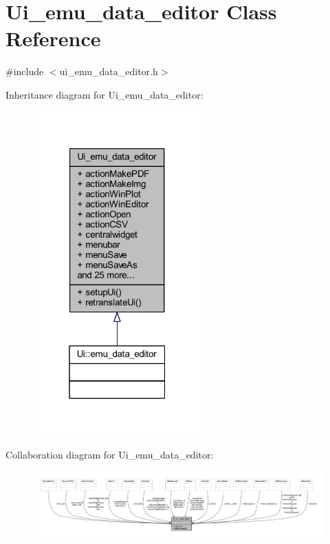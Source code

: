 \hypertarget{a00026}{\section{Ui\+\_\+emu\+\_\+data\+\_\+editor Class Reference}
\label{a00026}
}


{\ttfamily \#include $<$ui\+\_\+emu\+\_\+data\+\_\+editor.\+h$>$}



Inheritance diagram for Ui\+\_\+emu\+\_\+data\+\_\+editor\+:
\nopagebreak
\begin{figure}[H]
\begin{center}
\leavevmode
\includegraphics[width=184pt]{d1/d5d/a00311}
\end{center}
\end{figure}


Collaboration diagram for Ui\+\_\+emu\+\_\+data\+\_\+editor\+:
\nopagebreak
\begin{figure}[H]
\begin{center}
\leavevmode
\includegraphics[width=350pt]{d7/df2/a00312}
\end{center}
\end{figure}
